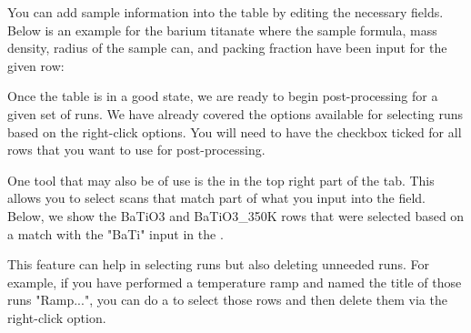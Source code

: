 You can add sample information into the table by editing the necessary fields. Below is an example for the barium titanate where the sample formula, mass density, radius of the sample can, and packing fraction have been input for the given row:

\noindent{}\label{graphic_sampleInfo}

Once the table is in a good state, we are ready to begin post-processing for a given set of runs. We have already covered the options available for selecting runs based on the right-click options. You will need to have the  checkbox ticked for all rows that you want to use for post-processing. 

One tool that may also be of use is the  in the top right part of the tab. This allows you to select scans that match part of what you input into the field. Below, we show the BaTiO3 and BaTiO3\_350K rows that were selected based on a match with the "BaTi" input in the .

\noindent{}

This feature can help in selecting runs but also deleting unneeded runs. For example, if you have performed a temperature ramp and named the title of those runs "Ramp...", you can do a  to select those rows and then delete them via the right-click option. 

